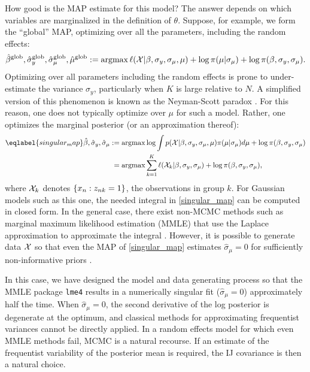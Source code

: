 How good is the MAP estimate for this model?  The answer depends on which
variables are marginalized in the definition of $\theta$.  Suppose, for example,
we form the ``global'' MAP, optimizing over all the parameters,
including the random effects:
%
\def\badmap{\textrm{glob}}
\begin{align*}
%
\hat\beta^{\badmap}, \hat\sigma_y^{\badmap},
\hat\sigma_\mu^{\badmap}, \hat\mu^{\badmap} :=
    \argmax \ell(\xvec | \beta, \sigma_y, \sigma_\mu, \mu) +
            \log \pi(\mu | \sigma_\mu) +
            \log \pi(\beta, \sigma_y, \sigma_\mu).
%
\end{align*}
%
Optimizing over all parameters including the random effects is prone to
under-estimate the variance $\sigma_y$, particularly when $K$ is large relative
to $N$.  A simplified version of this phenomenon is known as the
Neyman-Scott paradox \citep{freedman:2005:neymanscott}.  For this reason, one
does not typically optimize over $\mu$ for such a model.  Rather, one optimizes
the marginal posterior (or an approximation thereof):
%
\begin{align}\eqlabel{singular_map}
%
\hat\beta, \hat\sigma_y, \hat\sigma_\mu :=
    \argmax & \log \int p(\xvec | \beta, \sigma_y, \sigma_\mu, \mu)
        \pi(\mu | \sigma_\mu) d\mu  +
       \log \pi(\beta, \sigma_y, \sigma_\mu)
      \nonumber\\
= \argmax & \sum_{k=1}^K \ell(\xvec_k | \beta, \sigma_y, \sigma_\mu) +
\log \pi(\beta, \sigma_y, \sigma_\mu),
%
\end{align}
%
where ${\mathcal{X}}_k$ denotes $\{x_n: z_{nk} = 1\}$, the observations in group $k$.
For Gaussian models such as this one, the needed integral in
\eqref{singular_map} can be computed in closed form. In the general case, there
exist non-MCMC methods such as marginal maximum likelihood estimation (MMLE) that use
the Laplace approximation to approximate the integral
\citep{bates:2015:lme4}. However, it is possible to generate data ${\mathcal{X}}$ so
that even the MAP of \eqref{singular_map} estimates $\hat\sigma_\mu = 0$ for
sufficiently non-informative priors
\citep{chung:2012:avoiding,eager:2017:mixedterrible}.

In this case, we have designed the model and data generating process so that the
MMLE package \texttt{lme4} results in a numerically singular fit
($\hat\sigma_\mu = 0$) approximately half the time. When $\hat\sigma_\mu = 0$,
the second derivative of the log posterior is degenerate at the optimum, and
classical methods for approximating frequentist variances cannot be directly
applied.  In a random effects model for which even MMLE methods fail, MCMC is a
natural recourse. If an estimate of the frequentist variability of the posterior
mean is required, the IJ covariance is then a natural choice.


